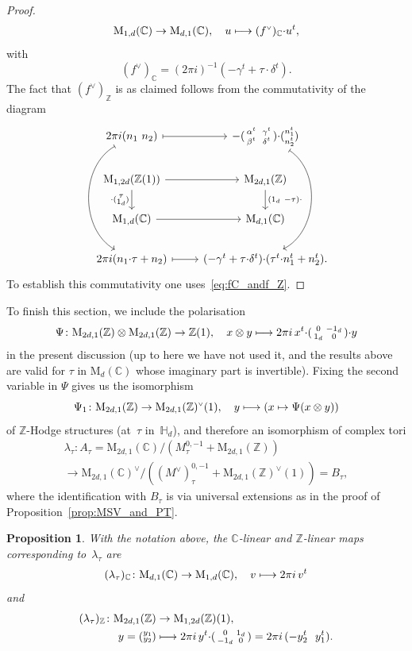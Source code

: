 \documentclass[JEP,XML,SOM,Unicode,NoFloatCountersInSection]{cedram}
\def\mto{\mathchoice{\longmapsto}{\mapsto}{\mapsto}{\mapsto}}
\let\oldvee\vee
\renewcommand{\vee}{{\scriptscriptstyle\oldvee}}
\theoremstyle{plain}
\newtheorem{Proposition}[subsection]{Proposition}
\theoremstyle{definition}
\numberwithin{equation}{subsection}
\renewcommand{\C}{\mathbb C}
\newcommand{\Z}{\mathbb Z}
\renewcommand{\H}{\mathbb H}
\newcommand{\rmM}{\mathrm{M}}
\begin{document}
\begin{proof}
\[
\rmM_{1,d}(\C)\to\rmM_{d,1}(\C), \quad u\mto
(f^\vee)_\C{\cdot}u^t,
\]
with
\[
(f^\vee)_\C = (2\pi i)^{-1} (-\gamma^t + \tau{\cdot}\delta^t).
\]
The fact that $(f^\vee)_\Z$ is as claimed follows from the
commutativity of the diagram
\[
\begin{tikzcd}
2\pi i(n_1\ n_2) \ar[r, mapsto] \ar[ddd, mapsto, bend right=60] &
-(\begin{smallmatrix} \alpha^t & \gamma^t\\ \beta^t &
\delta^t\end{smallmatrix})
{\cdot}(\substack{n_1^t\\ n_2^t}) \ar[ddd, mapsto, bend left=60]\\
\rmM_{1,2d}(\Z(1)) \ar[r] \ar[d,"{\cdot}(\substack{\tau\\ 1_d})"'] &
\rmM_{2d,1}(\Z) \ar[d,"(1_d\ -\tau){\cdot}"] \\
\rmM_{1,d}(\C) \ar[r] & \rmM_{d,1}(\C)\\
2\pi i (n_1{\cdot}\tau + n_2)\ar[r,mapsto] &
(-\gamma^t + \tau{\cdot}\delta^t){\cdot}(\tau^t{\cdot}n_1^t+n_2^t).
\end{tikzcd}
\]
To establish this commutativity one uses~\eqref{eq:fC_andf_Z}.
\end{proof}
To finish this section, we include the polarisation
\[
\Psi\colon \rmM_{2d,1}(\Z)\otimes\rmM_{2d,1}(\Z)\to\Z(1), \quad
x\otimes y\mto 2\pi i\,x^t{\cdot}(\begin{smallmatrix} 0 & -1_d\\ 1_d &
0\end{smallmatrix}){\cdot}y
\]
in the present discussion (up to here we have not used it, and the
results above are valid for $\tau$
in $\rmM_d(\C)$ whose imaginary part is invertible). Fixing the
second variable in $\Psi$ gives us the isomorphism
\[
\Psi_1\colon \rmM_{2d,1}(\Z) \to \rmM_{2d,1}(\Z)^\vee(1),\quad
y\mto \left( x\mapsto \Psi(x\otimes y)\right)
\]
of $\Z$-Hodge structures (at~$\tau$ in~$\H_d$), and therefore an
isomorphism of complex tori
\begin{multline*}
\lambda_\tau\colon
A_\tau = \rmM_{2d,1}(\C)/(M^{0,-1}_\tau+\rmM_{2d,1}(\Z))\\
\to
\rmM_{2d,1}(\C)^\vee/((M^\vee)^{0,-1}_\tau+\rmM_{2d,1}(\Z)^\vee(1))=B_\tau,
\end{multline*}
where the identification with $B_\tau$ is via universal
extensions as in the proof of Proposition~\ref{prop:MSV_and_PT}.
\begin{Proposition}\label{prop:pol_Z_and_C}
With the notation above, the $\C$-linear and $\Z$-linear maps
corresponding to~$\lambda_\tau$ are
\[
(\lambda_\tau)_\C\colon \rmM_{d,1}(\C)\to\rmM_{1,d}(\C),\quad v\mto 2\pi i\, v^t
\]
and
\[
\begin{aligned}
(\lambda_\tau)_\Z\colon \rmM_{2d,1}(\Z) & \to\rmM_{1,2d}(\Z)(1),\\
y=(\substack{y_1\\ y_2}) & \mto
2\pi i\, y^t{\cdot}(\begin{smallmatrix}0 & 1_d\\-1_d &
0\end{smallmatrix}) = 2\pi i\, (-y_2^t\ \ y_1^t).
\end{aligned}
\]
\end{Proposition}
\end{document}
